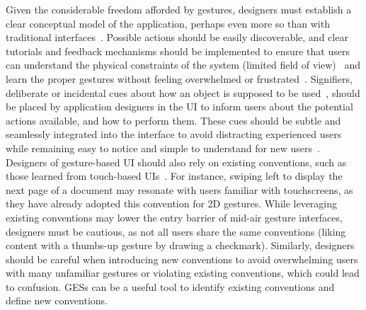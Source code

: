 Given the considerable freedom afforded by gestures, designers must establish a clear conceptual model of the application, perhaps even more so than with traditional interfaces~\cite{Norman:2010}.
%
Possible actions should be easily discoverable, and clear tutorials and feedback mechanisms should be implemented to ensure that users can understand the physical constraints of the system (\eg limited field of view)~\cite{Norman:1999} and learn the proper gestures without feeling overwhelmed or frustrated~\cite{Norman:2010}. 
%
Signifiers, \ie deliberate or incidental cues about how an object is supposed to be used~\cite{Norman:2008}, should be placed by application designers in the UI to inform users about the potential actions available, and how to perform them. These cues should be subtle and seamlessly integrated into the interface to avoid distracting experienced users while remaining easy to notice and simple to understand for new users~\cite{Rovelo:2015,Walter:2013}.
%
Designers of gesture-based UI should also rely on existing conventions, such as those learned from touch-based UIs~\cite{Norman:1999}. For instance, swiping left to display the next page of a document may resonate with users familiar with touchscreens, as they have already adopted this convention for 2D gestures. 
%
While leveraging existing conventions may lower the entry barrier of mid-air gesture interfaces, designers must be cautious, as not all users share the same conventions (\eg liking content with a thumbs-up gesture \vs by drawing a checkmark). 
Similarly, designers should be careful when introducing new conventions to avoid overwhelming users with many unfamiliar gestures or violating existing conventions, which could lead to confusion. 
GESs can be a useful tool to identify existing conventions and define new conventions.


